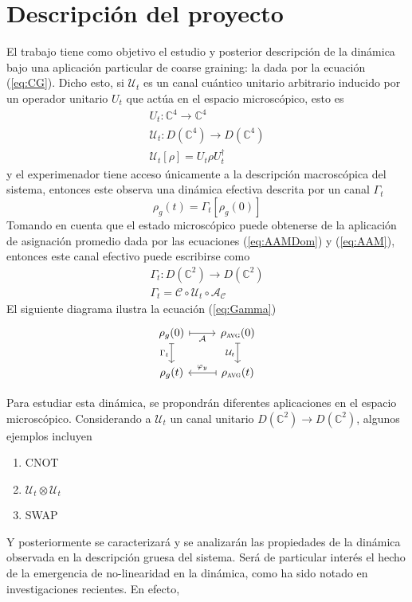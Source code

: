 \documentclass[onecolumn,11pt]{article}
\newcommand{\mcU}{\mathcal{U}}
\newcommand{\mcC}{\mathcal{C}}
\newcommand{\mcA}{\mathcal{A}}
\newcommand{\Complex}{\mathbb{C}} %
\begin{document}
\section{Descripción del proyecto}

El trabajo tiene como objetivo el estudio y posterior descripción de la dinámica bajo una aplicación particular de coarse graining: la dada por la ecuación (\ref{eq:CG}). Dicho esto, si $\mcU_{t}$ es un canal cuántico unitario arbitrario inducido por un operador unitario $U_{t}$ que actúa en el espacio microscópico, esto es
\begin{gather}
U_{t}:\Complex^{4} \rightarrow \Complex^{4} \label{eq:UnitOpDyn}\\
\mcU_{t}:D(\Complex^{4})\rightarrow D(\Complex^{4}) \label{eq:UnitChaDyn}\\
\mcU_{t}[\rho]=U_{t}\rho U_{t}^{\dag}
\end{gather}
y el experimenador tiene acceso únicamente a la descripción macroscópica del sistema, entonces este observa una dinámica efectiva descrita por un canal $\Gamma_{t}$
\begin{equation}
\rho_{g}(t)=\Gamma_{t}[\rho_{g}(0)]
\end{equation}
Tomando en cuenta que el estado microscópico puede obtenerse de la aplicación de asignación promedio dada por las ecuaciones (\ref{eq:AAMDom}) y (\ref{eq:AAM}), entonces este canal efectivo puede escribirse como
\begin{gather}
\Gamma_{t}:D(\Complex^{2})\rightarrow D(\Complex^{2})\label{eq:GammaDom}\\
\Gamma_{t}=\mcC\circ\mcU_{t}\circ\mcA_{\mcC}\label{eq:Gamma}
\end{gather}
El siguiente diagrama ilustra la ecuación (\ref{eq:Gamma})
\[\begin{tikzcd}[arrows={<-|}]
\rho_{g}(0)  & \rho_{\textsc{avg}}(0) \arrow{l}{\mcA} \\
\rho_{g}(t) \arrow{u}{\Gamma_{t}} \arrow{r}{\varphi_y} & \rho_{\textsc{avg}}(t) \arrow{u}{\mcU_{t}}
\end{tikzcd}
\]

Para estudiar esta dinámica, se propondrán diferentes aplicaciones en el espacio microscópico. Considerando a $\mcU_{t}$ un canal unitario $D(\Complex^{2})\rightarrow D(\Complex^{2})$, algunos ejemplos incluyen
    \begin{multicols}{3}
    \begin{enumerate}
        \item \textsc{CNOT}
        \item $\mcU_{t}\otimes \mcU_{t}$
        \item \textsc{SWAP}
    \end{enumerate}
    \end{multicols}
Y posteriormente se caracterizará y se analizarán las propiedades de la dinámica observada en la descripción gruesa del sistema. Será de particular interés el hecho de la emergencia de no-linearidad en la dinámica, como ha sido notado en investigaciones recientes\cite{Macro-To-Micro}\cite{CGEmergingDynamics}. En efecto,
\end{document}
